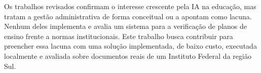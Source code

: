 Os trabalhos revisados confirmam o interesse crescente pela IA na educação, mas tratam a gestão administrativa de forma conceitual ou a apontam como lacuna. Nenhum deles implementa e avalia um sistema para a verificação de planos de ensino frente a normas institucionais. Este trabalho busca contribuir para preencher essa lacuna com uma solução implementada, de baixo custo, executada localmente e avaliada sobre documentos reais de um Instituto Federal da região Sul.
